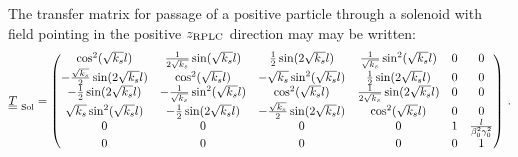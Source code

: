 The transfer matrix for passage of a positive particle through a
solenoid with field pointing in the positive $z_{\rm RPLC}$ direction
may may be written: 
\begin{equation}
  \underline{\underline{T}}_{\rm~Sol} =
    \begin{pmatrix}
                             \cos^2(\sqrt{k_s} l) &   \frac{1}{2\sqrt{k_s}} \sin(\sqrt{k_s} l) &         \frac{1}{2} \sin(2\sqrt{k_s} l) & \frac{1}{\sqrt{k_s}} \sin^2(\sqrt{k_s} l) & 0 & 0 \\
          -\frac{\sqrt{k_s}}{2} \sin(2\sqrt{k_s} l) &                     \cos^2(\sqrt{k_s} l) &           -\sqrt{k_s}\sin^2(\sqrt{k_s} l) &         \frac{1}{2} \sin(2\sqrt{k_s} l) & 0 & 0 \\
                 -\frac{1}{2} \sin(2\sqrt{k_s} l) & -\frac{1}{\sqrt{k_s}} \sin^2(\sqrt{k_s} l) &                    \cos^2(\sqrt{k_s} l) & \frac{1}{2\sqrt{k_s}} \sin(2\sqrt{k_s} l) & 0 & 0 \\
                    \sqrt{k_s} \sin^2(\sqrt{k_s} l) &         -\frac{1}{2} \sin(2\sqrt{k_s} l) & -\frac{\sqrt{k_s}}{2} \sin(2\sqrt{k_s} l) &                    \cos^2(\sqrt{k_s} l) & 0 & 0 \\
          0 & 0 & 0 & 0 & 1 & \frac{l}{\beta_0^2 \gamma_0^2} \\
          0 & 0 & 0 & 0 & 0 &                             1
        \end{pmatrix} \, .
\end{equation}

